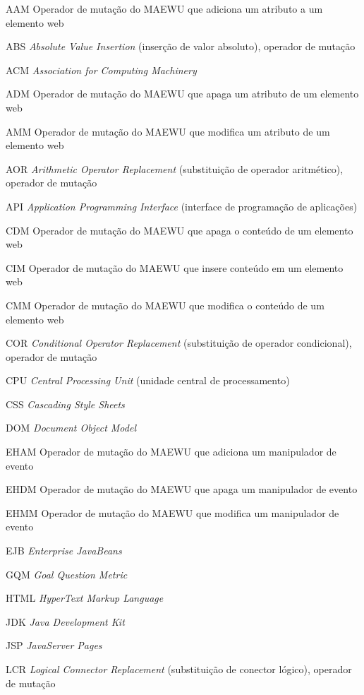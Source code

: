 \begin{siglas}
\item[AAM] Operador de mutação do MAEWU que adiciona um atributo a um elemento web
  \item[ABS] \textit{Absolute Value Insertion} (inserção de valor absoluto), operador de mutação
  \item[ACM] \textit{Association for Computing Machinery}
  \item[ADM] Operador de mutação do MAEWU que apaga um atributo de um elemento web
  \item[AMM] Operador de mutação do MAEWU que modifica um atributo de um elemento web
  \item[AOR] \textit{Arithmetic Operator Replacement} (substituição de operador aritmético), operador de mutação
  \item[API] \textit{Application Programming Interface} (interface de programação de aplicações)
  \item[CDM] Operador de mutação do MAEWU que apaga o conteúdo de um elemento web
  \item[CIM] Operador de mutação do MAEWU que insere conteúdo em um elemento web
  \item[CMM] Operador de mutação do MAEWU que modifica o conteúdo de um elemento web
  \item[COR] \textit{Conditional Operator Replacement} (substituição de operador condicional), operador de mutação
  \item[CPU] \textit{Central Processing Unit} (unidade central de processamento)
  \item[CSS] \textit{Cascading Style Sheets}
  \item[DOM] \textit{Document Object Model}
  \item[EHAM] Operador de mutação do MAEWU que adiciona um manipulador de evento
  \item[EHDM] Operador de mutação do MAEWU que apaga um manipulador de evento
  \item[EHMM] Operador de mutação do MAEWU que modifica um manipulador de evento
  \item[EJB] \textit{Enterprise JavaBeans}
  \item[GQM] \textit{Goal Question Metric}
  \item[HTML] \textit{HyperText Markup Language}
  \item[JDK] \textit{Java Development Kit}
  \item[JSP] \textit{JavaServer Pages}
  \item[LCR] \textit{Logical Connector Replacement} (substituição de conector lógico), operador de mutação

\end{siglas}
